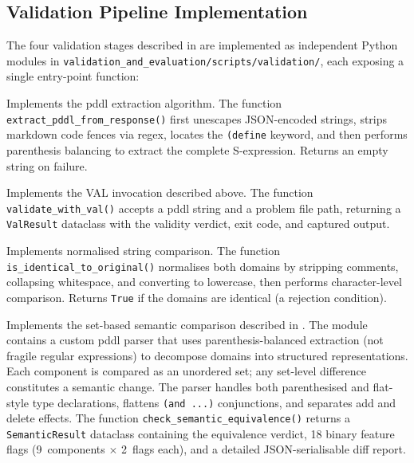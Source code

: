 \subsection{Validation Pipeline Implementation}
\label{sec:impl:val:pipeline}

The four validation stages described in  are implemented as independent Python modules in \texttt{validation\_and\_evaluation/scripts/validation/}, each exposing a single entry-point function:

\begin{description}[style=nextline, leftmargin=1.0cm]
  \item[\textbf{V1} (\texttt{v1\_extraction.py}):] Implements the \gls{pddl} extraction algorithm. The function \texttt{extract\_pddl\_from\_response()} first unescapes JSON-encoded strings, strips markdown code fences via regex, locates the \texttt{(define} keyword, and then performs parenthesis balancing to extract the complete S-expression. Returns an empty string on failure.

  \item[\textbf{V2} (\texttt{v2\_syntactic\_validation.py}):] Implements the VAL invocation described above. The function \texttt{validate\_with\_val()} accepts a \gls{pddl} string and a problem file path, returning a \texttt{ValResult} dataclass with the validity verdict, exit code, and captured output.

  \item[\textbf{V3} (\texttt{v3\_identity\_check.py}):] Implements normalised string comparison. The function \texttt{is\_identical\_to\_original()} normalises both domains by stripping comments, collapsing whitespace, and converting to lowercase, then performs character-level comparison. Returns \texttt{True} if the domains are identical (a rejection condition).

  \item[\textbf{V4} (\texttt{v4\_semantic\_equivalence.py}):] Implements the set-based semantic comparison described in . The module contains a custom \gls{pddl} parser that uses parenthesis-balanced extraction (not fragile regular expressions) to decompose domains into structured representations. Each component is compared as an unordered set; any set-level difference constitutes a semantic change. The parser handles both parenthesised and flat-style type declarations, flattens \texttt{(and ...)} conjunctions, and separates add and delete effects. The function \texttt{check\_semantic\_equivalence()} returns a \texttt{SemanticResult} dataclass containing the equivalence verdict, 18 binary feature flags (9~components $\times$ 2~flags each), and a detailed JSON-serialisable diff report.
\end{description}


